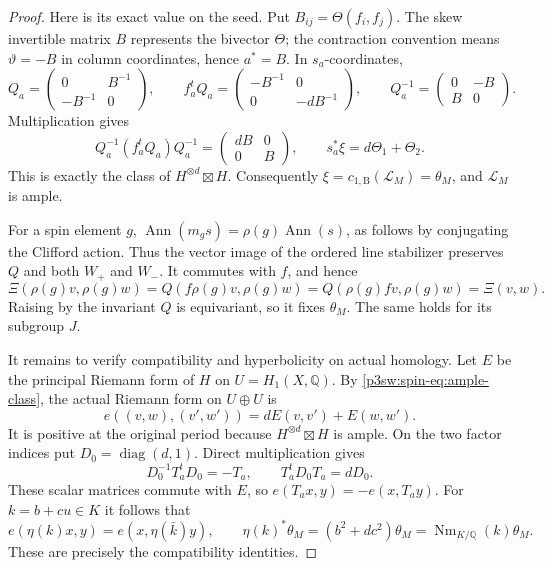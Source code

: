\documentclass[11pt]{article}
\newcommand{\Q}{\mathbb Q}
\numberwithin{equation}{section}
\begin{document}
\begin{proof}
Here is its exact value on the seed.  Put
\(B_{ij}=\Theta(f_i,f_j)\).  The skew invertible matrix \(B\)
represents the bivector \(\Theta\); the contraction convention means
\(\vartheta=-B\) in column coordinates, hence \(a^*=B\).
In \(s_a\)-coordinates,
\[
 Q_a=\begin{pmatrix}0&B^{-1}\\-B^{-1}&0\end{pmatrix},\qquad
 f_a^tQ_a=\begin{pmatrix}-B^{-1}&0\\0&-dB^{-1}\end{pmatrix},\qquad
 Q_a^{-1}=\begin{pmatrix}0&-B\\B&0\end{pmatrix}.
\]
Multiplication gives
\begin{equation}
\label{p3sw:spin-eq:ample-class}
 Q_a^{-1}(f_a^tQ_a)Q_a^{-1}
       =\begin{pmatrix}dB&0\\0&B\end{pmatrix},\qquad
 s_a^*\xi=d\Theta_1+\Theta_2.
\end{equation}
This is exactly the class of \(H^{\otimes d}\boxtimes H\).
Consequently \(\xi=c_{1,\mathrm B}(\mathscr L_M)=\theta_M\), and
\(\mathscr L_M\) is ample.

For a spin element \(g\),
\(\operatorname{Ann}(m_gs)=\rho(g)\operatorname{Ann}(s)\), as follows
by conjugating the Clifford action.  Thus the vector image of the
ordered line stabilizer preserves \(Q\) and both \(W_+\) and \(W_-\).
It commutes with \(f\), and hence
\[
 \Xi(\rho(g)v,\rho(g)w)
  =Q(f\rho(g)v,\rho(g)w)=Q(\rho(g)fv,\rho(g)w)=\Xi(v,w).
\]
Raising by the invariant \(Q\) is equivariant, so it fixes
\(\theta_M\).  The same holds for its subgroup \(J\).

It remains to verify compatibility and hyperbolicity on actual
homology.  Let \(E\) be the principal Riemann form of \(H\) on
\(U=H_1(X,\Q)\).  By \eqref{p3sw:spin-eq:ample-class}, the actual
Riemann form on \(U\oplus U\) is
\[
 e((v,w),(v',w'))=dE(v,v')+E(w,w').
\]
It is positive at the original period because \(H^{\otimes d}\boxtimes H\)
is ample.  On the two factor indices put \(D_0=\operatorname{diag}(d,1)\).
Direct multiplication gives
\[
 D_0^{-1}T_a^tD_0=-T_a,\qquad T_a^tD_0T_a=dD_0.
\]
These scalar matrices commute with \(E\), so
\(e(T_ax,y)=-e(x,T_ay)\).  For \(k=b+cu\in K\) it follows that
\[
 e(\eta(k)x,y)=e(x,\eta(\bar k)y),\qquad
 \eta(k)^*\theta_M=(b^2+dc^2)\theta_M
                   =\operatorname{Nm}_{K/\Q}(k)\theta_M.
\]
These are precisely the compatibility identities.


\end{proof}
\end{document}
